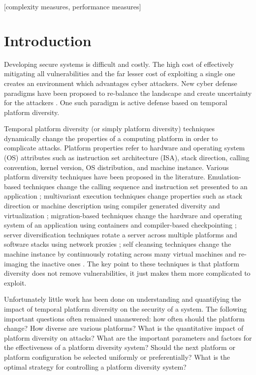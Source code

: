\documentclass{acm_proc_article-sp}
\begin{document}
[complexity measures, performance measures]



\section{Introduction}
Developing secure systems is difficult and costly. The high cost of effectively mitigating all vulnerabilities and the
far lesser cost of exploiting a single one creates an environment which advantages cyber attackers. New cyber defense
paradigms have been proposed to re-balance the landscape and create uncertainty for the attackers \cite{nitrd}. One such
paradigm is active defense based on temporal platform diversity.

Temporal platform diversity (or simply platform diversity) techniques dynamically change the properties of a computing
platform in order to complicate attacks. Platform properties refer to hardware and operating system (OS) attributes such
as instruction set architecture (ISA), stack direction, calling convention, kernel version, OS distribution, and machine
instance. Various platform diversity techniques have been proposed in the literature. Emulation-based techniques change
the calling sequence and instruction set presented to an application \cite{genesis}; multivariant execution techniques
change properties such as stack direction or machine description using compiler generated diversity and virtualization
\cite{multivariant,multivariant2,multivariant3,machinedesc}; migration-based techniques change the hardware and
operating system of an application using containers and compiler-based checkpointing \cite{talent}; server
diversification techniques rotate a server across multiple platforms and software stacks using network proxies
\cite{webserver}; self cleansing techniques change the machine instance by continuously rotating across many virtual
machines and re-imaging the inactive ones \cite{scit,scit2,scit3}. The key point to these techniques is that platform
diversity does not remove vulnerabilities, it just makes them more complicated to exploit.

Unfortunately little work has been done on understanding and quantifying the impact of temporal platform diversity on the security of a system. The following important questions often remained unanswered: how often should the platform change? How diverse are various platforms? What is the quantitative impact of platform diversity on attacks? What are the important parameters and factors for the effectiveness of a platform diversity system? Should the next platform or platform configuration be selected uniformly or preferentially? What is the optimal strategy for controlling a platform diversity system?
\end{document}
